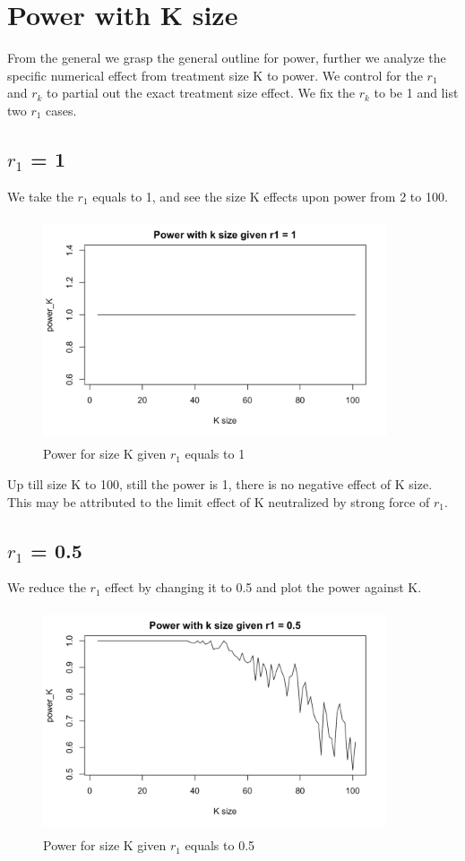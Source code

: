 \documentclass[english]{article}\usepackage{graphicx, color}
\numberwithin{equation}{section}
\numberwithin{figure}{section}
\begin{document}
\section{Power with K size}
From the general we grasp the general outline for power, further we analyze the specific numerical effect from treatment size K to power. We control for the $r_1$ and $r_k$ to partial out the exact treatment size effect. We fix the $r_k$ to be 1 and list two $r_1$ cases. 
\subsection{$r_1$ = 1}
We take the $r_1$ equals to 1, and see the size K effects upon power from 2 to 100.

\begin{figure}[htbp]
\centering\includegraphics[width=4in,height=2.6in]{p_r1_1}
\caption{Power for size K given $r_1$ equals to 1}
\end{figure}
Up till size K to 100, still the power is 1, there is no negative effect of K size. This may be attributed to the limit effect of K neutralized by strong force of $r_1$.  
\subsection{$r_1$ = 0.5}
We reduce the $r_1$ effect by changing it to 0.5 and plot the power against K.
\begin{figure}[htbp]
\centering\includegraphics[width=4in, height=2.6in]{p_r1_5}
\caption{Power for size K given $r_1$ equals to 0.5}
\end{figure}
\end{document}
